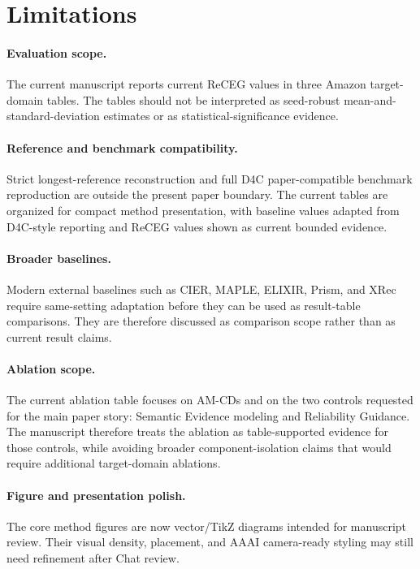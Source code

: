 \section{Limitations}

\paragraph{Evaluation scope.}
The current manuscript reports current ReCEG values in three Amazon
target-domain tables. The tables should not be interpreted as seed-robust
mean-and-standard-deviation estimates or as statistical-significance evidence.

\paragraph{Reference and benchmark compatibility.}
Strict longest-reference reconstruction and full D4C paper-compatible
benchmark reproduction are outside the present paper boundary. The current
tables are organized for compact method presentation, with baseline values
adapted from D4C-style reporting and ReCEG values shown as current bounded
evidence.

\paragraph{Broader baselines.}
Modern external baselines such as CIER, MAPLE, ELIXIR, Prism, and XRec require
same-setting adaptation before they can be used as result-table comparisons.
They are therefore discussed as comparison scope rather than as current result
claims.

\paragraph{Ablation scope.}
The current ablation table focuses on AM-CDs and on the two controls requested
for the main paper story: Semantic Evidence modeling and Reliability Guidance.
The manuscript therefore treats the ablation as table-supported evidence for
those controls, while avoiding broader component-isolation claims that would
require additional target-domain ablations.

\paragraph{Figure and presentation polish.}
The core method figures are now vector/TikZ diagrams intended for manuscript
review. Their visual density, placement, and AAAI camera-ready styling may
still need refinement after Chat review.
